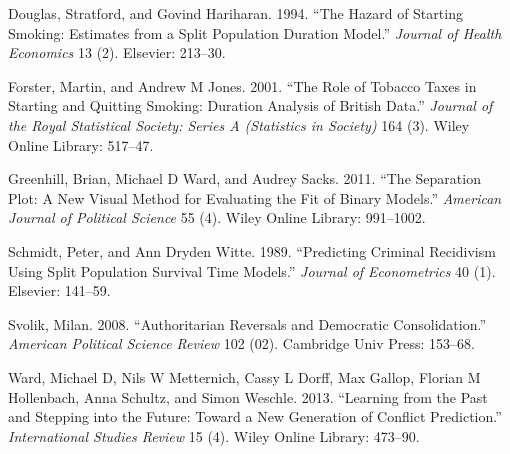 \documentclass[article]{jss}
\begin{document}
Douglas, Stratford, and Govind Hariharan. 1994. ``The Hazard of Starting
Smoking: Estimates from a Split Population Duration Model.''
\emph{Journal of Health Economics} 13 (2). Elsevier: 213--30.

Forster, Martin, and Andrew M Jones. 2001. ``The Role of Tobacco Taxes
in Starting and Quitting Smoking: Duration Analysis of British Data.''
\emph{Journal of the Royal Statistical Society: Series A (Statistics in
Society)} 164 (3). Wiley Online Library: 517--47.

Greenhill, Brian, Michael D Ward, and Audrey Sacks. 2011. ``The
Separation Plot: A New Visual Method for Evaluating the Fit of Binary
Models.'' \emph{American Journal of Political Science} 55 (4). Wiley
Online Library: 991--1002.

Schmidt, Peter, and Ann Dryden Witte. 1989. ``Predicting Criminal
Recidivism Using Split Population Survival Time Models.'' \emph{Journal
of Econometrics} 40 (1). Elsevier: 141--59.

Svolik, Milan. 2008. ``Authoritarian Reversals and Democratic
Consolidation.'' \emph{American Political Science Review} 102 (02).
Cambridge Univ Press: 153--68.

Ward, Michael D, Nils W Metternich, Cassy L Dorff, Max Gallop, Florian M
Hollenbach, Anna Schultz, and Simon Weschle. 2013. ``Learning from the
Past and Stepping into the Future: Toward a New Generation of Conflict
Prediction.'' \emph{International Studies Review} 15 (4). Wiley Online
Library: 473--90.
\end{document}
